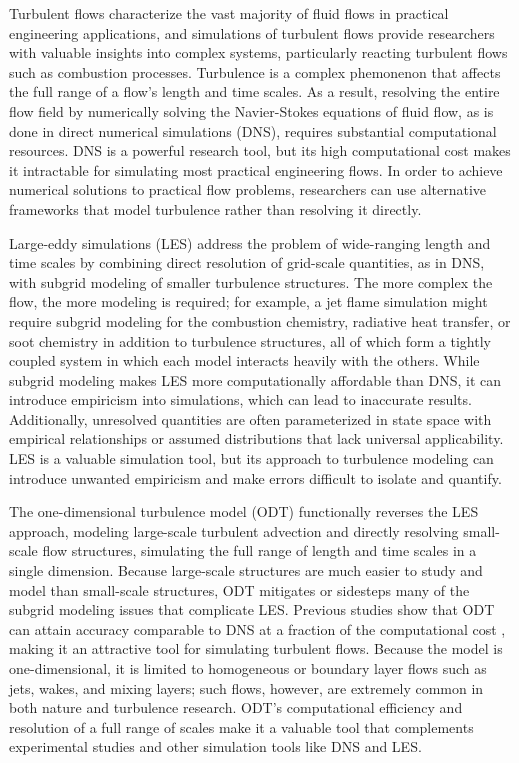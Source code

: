 \documentclass[preprint,12pt, a4paper]{elsarticle}
\begin{document}
Turbulent flows characterize the vast majority of fluid flows in practical engineering applications, and simulations of turbulent flows provide researchers with valuable insights into complex systems, particularly reacting turbulent flows such as combustion processes. Turbulence is a complex phemonenon that affects the full range of a flow's length and time scales. As a result, resolving the entire flow field by numerically solving the Navier-Stokes equations of fluid flow, as is done in direct numerical simulations (DNS), requires substantial computational resources. DNS is a powerful research tool, but its high computational cost makes it intractable for simulating most practical engineering flows. In order to achieve numerical solutions to practical flow problems, researchers can use alternative frameworks that model turbulence rather than resolving it directly.

Large-eddy simulations (LES) address the problem of wide-ranging length and time scales by combining  direct resolution of grid-scale quantities, as in DNS, with subgrid modeling of smaller turbulence structures. The more complex the flow, the more modeling is required; for example, a jet flame simulation might require subgrid modeling for the combustion chemistry, radiative heat transfer, or soot chemistry in addition to turbulence structures, all of which form a tightly coupled system in which each model interacts heavily with the others. While subgrid modeling makes LES more computationally affordable than DNS, it can introduce empiricism into simulations, which can lead to inaccurate results. Additionally, unresolved quantities are often parameterized in state space with empirical relationships or assumed distributions that lack universal applicability. LES is a valuable simulation tool, but its approach to turbulence modeling can introduce unwanted empiricism and make errors difficult to isolate and quantify.

The one-dimensional turbulence model (ODT) functionally reverses the LES approach, modeling large-scale turbulent advection and directly resolving small-scale flow structures, simulating the full range of length and time scales in a single dimension. Because large-scale structures are much easier to study and model than small-scale structures, ODT mitigates or sidesteps many of the subgrid modeling issues that complicate LES. Previous studies show that ODT can attain accuracy comparable to DNS at a fraction of the computational cost \cite{Lignell_2015,Abboud_2015}, making it an attractive tool for simulating turbulent flows. Because the model is one-dimensional, it is limited to homogeneous or boundary layer flows such as jets, wakes, and mixing layers; such flows, however, are extremely common in both nature and turbulence research. ODT's computational efficiency and resolution of a full range of scales make it a valuable tool that complements experimental studies and other simulation tools like DNS and LES.
\end{document}
